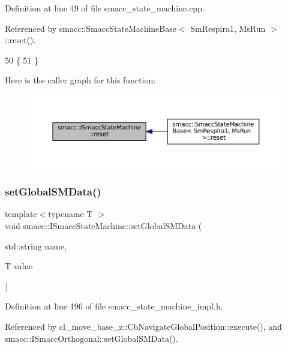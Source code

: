 Definition at line 49 of file smacc\+\_\+state\+\_\+machine.\+cpp.



Referenced by smacc\+::\+Smacc\+State\+Machine\+Base$<$ Sm\+Respira1, Ms\+Run $>$\+::reset().


\begin{DoxyCode}
50 \{
51 \}
\end{DoxyCode}
Here is the caller graph for this function\+:
\nopagebreak
\begin{figure}[H]
\begin{center}
\leavevmode
\includegraphics[width=350pt]{classsmacc_1_1ISmaccStateMachine_a9e4b4fe4dda962642397993235c6eea0_icgraph}
\end{center}
\end{figure}
\mbox{\label{classsmacc_1_1ISmaccStateMachine_a8588f9e580fbb95b53e2bd2ca3ff1f98}} 
\subsubsection{\texorpdfstring{set\+Global\+S\+M\+Data()}{setGlobalSMData()}}
{\footnotesize\ttfamily template$<$typename T $>$ \\
void smacc\+::\+I\+Smacc\+State\+Machine\+::set\+Global\+S\+M\+Data (\begin{DoxyParamCaption}\item[{std\+::string}]{name,  }\item[{T}]{value }\end{DoxyParamCaption})}



Definition at line 196 of file smacc\+\_\+state\+\_\+machine\+\_\+impl.\+h.



Referenced by cl\+\_\+move\+\_\+base\+\_\+z\+::\+Cb\+Navigate\+Global\+Position\+::execute(), and smacc\+::\+I\+Smacc\+Orthogonal\+::set\+Global\+S\+M\+Data().


